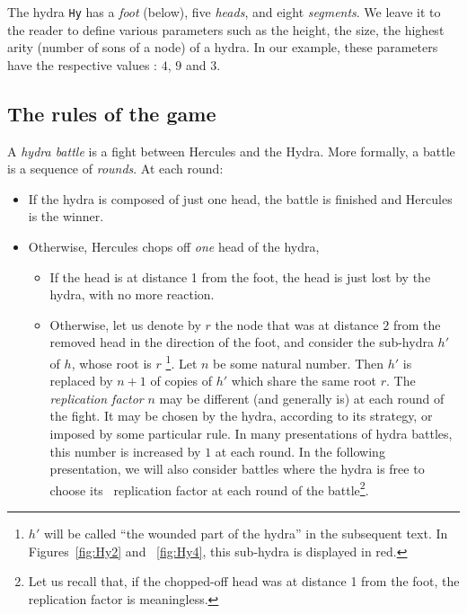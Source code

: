 \documentclass[a4paper]{book}
\begin{document}
The hydra \texttt{Hy} has a \emph{foot} (below), five \emph{heads}, and eight \emph{segments}. 
We leave it to the reader to define various parameters such as the height, the size, the highest arity (number of sons of a node) of a hydra. In our example, these parameters have the respective values : $4$, $9$ and $3$.




\subsection{The rules of the game}

\label{sec:orgheadline44}
\label{sect:replication-def}

A \emph{hydra battle} is a fight between Hercules and the Hydra. 
More formally, a  battle is a sequence of \emph{rounds}.
At each round:
\begin{itemize}
\item If the hydra is composed of just one head, the battle is finished
and  Hercules is the winner.
\item Otherwise, Hercules chops off \emph{one} head of the hydra,

\begin{itemize}
\item If the head is at distance 1 from the foot, the head is just lost by the hydra, with no more reaction.
\item Otherwise, let us denote by \(r\) the node that was at distance \(2\) from 
the removed head in the direction of the foot,  and consider the  sub-hydra \(h'\) of \(h\), whose  root is \(r\) \footnote{$h'$ will be called ``the wounded part of the hydra'' in the subsequent text. In Figures~\vref{fig:Hy2} and ~\vref{fig:Hy4}, this sub-hydra  is displayed in red.}. Let $n$ be some natural number.
Then $h'$ is replaced by  $n+1$ of copies of \(h'\) which share the same root $r$.
 The \emph{replication factor} $n$ may be different (and generally is)   at each round of the fight.
It may be chosen by the hydra, according to its strategy, or imposed by some 
particular rule. In many presentations of hydra battles, this number is increased by $1$ at each round. In the following presentation, we will also consider battles where the hydra is free to choose its ~replication factor at each round of the battle\footnote{Let us recall that, if the chopped-off head was at distance 1 from the foot, the replication factor is meaningless.}.
\end{itemize}
\end{itemize}
\end{document}
